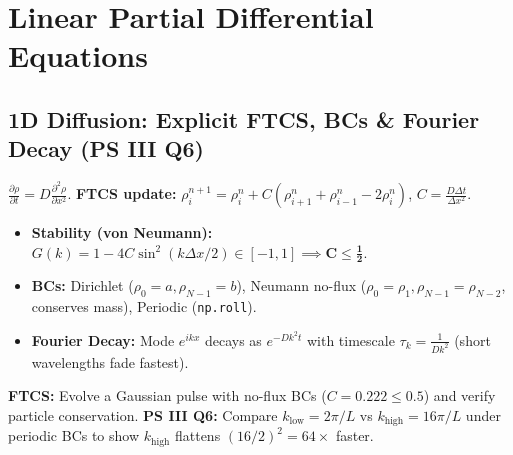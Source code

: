 \documentclass[10pt,a4paper]{article}
\begin{document}
\section{Linear Partial Differential Equations}

\subsection{1D Diffusion: Explicit FTCS, BCs \& Fourier Decay (PS III Q6)}
\begin{theorybox}
$\frac{\partial\rho}{\partial t} = D\frac{\partial^2\rho}{\partial x^2}$. \textbf{FTCS update:} $\rho_i^{n+1} = \rho_i^n + C(\rho_{i+1}^n + \rho_{i-1}^n - 2\rho_i^n)$, \; $C = \frac{D\Delta t}{\Delta x^2}$.
\begin{itemize}
\item \textbf{Stability (von Neumann):} $G(k) = 1 - 4C\sin^2(k\Delta x/2) \in [-1, 1] \implies \mathbf{C \le \frac{1}{2}}$.
\item \textbf{BCs:} Dirichlet ($\rho_0=a, \rho_{N-1}=b$), Neumann no-flux ($\rho_0=\rho_1, \rho_{N-1}=\rho_{N-2}$, conserves mass), Periodic (\texttt{np.roll}).
\item \textbf{Fourier Decay:} Mode $e^{ikx}$ decays as $e^{-Dk^2 t}$ with timescale $\tau_k = \frac{1}{Dk^2}$ (short wavelengths fade fastest).
\end{itemize}
\end{theorybox}

\begin{goalbox}
\textbf{FTCS:} Evolve a Gaussian pulse with no-flux BCs ($C = 0.222 \le 0.5$) and verify particle conservation. \textbf{PS III Q6:} Compare $k_{\text{low}} = 2\pi/L$ vs $k_{\text{high}} = 16\pi/L$ under periodic BCs to show $k_{\text{high}}$ flattens $(16/2)^2 = 64\times$ faster.
\end{goalbox}
\end{document}
